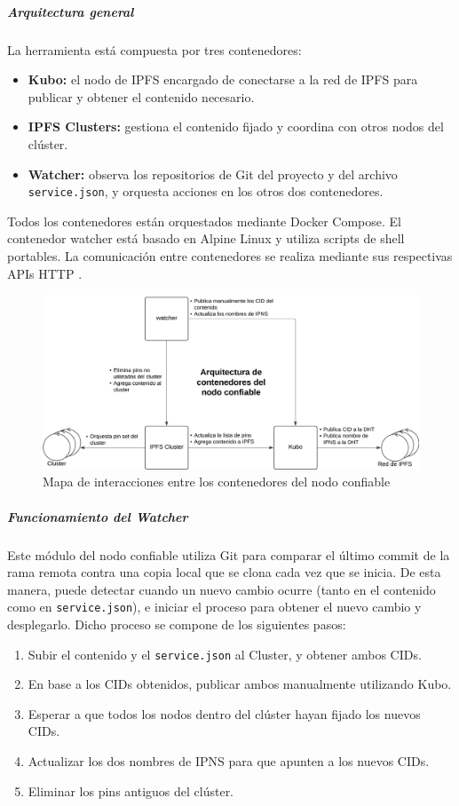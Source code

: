 \subparagraph{Arquitectura general}

La herramienta está compuesta por tres contenedores:
\begin{itemize}
    \item \textbf{Kubo:} el nodo de IPFS encargado de conectarse a la red de IPFS para publicar y obtener el contenido necesario.
    \item \textbf{IPFS Clusters:} gestiona el contenido fijado y coordina con otros nodos del clúster.
    \item \textbf{Watcher:} observa los repositorios de Git del proyecto y del archivo \texttt{service.json}, y orquesta acciones en los otros dos contenedores.
\end{itemize}

Todos los contenedores están orquestados mediante Docker Compose. El contenedor watcher está basado en Alpine Linux y utiliza scripts de shell portables. La comunicación entre contenedores se realiza mediante sus respectivas APIs HTTP \cite{kubo-api} \cite{cluster-api}.

\begin{figure}[h!]
    \centering
    \includegraphics[width=1\linewidth]{img/solucion-ipfs/contenedores-trusted-peer.png}
    \caption{Mapa de interacciones entre los contenedores del nodo confiable}
    \label{fig:contenedores-trusted-peer}
\end{figure}

\subparagraph{Funcionamiento del Watcher} Este módulo del nodo confiable utiliza Git para comparar el último commit de la rama remota contra una copia local que se clona cada vez que se inicia. De esta manera, puede detectar cuando un nuevo cambio ocurre (tanto en el contenido como en \texttt{service.json}), e iniciar el proceso para obtener el nuevo cambio y desplegarlo. Dicho proceso se compone de los siguientes pasos:
\begin{enumerate}
    \item Subir el contenido y el \texttt{service.json} al Cluster, y obtener ambos CIDs.
    \item En base a los CIDs obtenidos, publicar ambos manualmente utilizando Kubo.
    \item Esperar a que todos los nodos dentro del clúster hayan fijado los nuevos CIDs.
    \item Actualizar los dos nombres de IPNS para que apunten a los nuevos CIDs.
    \item Eliminar los pins antiguos del clúster.
\end{enumerate}

